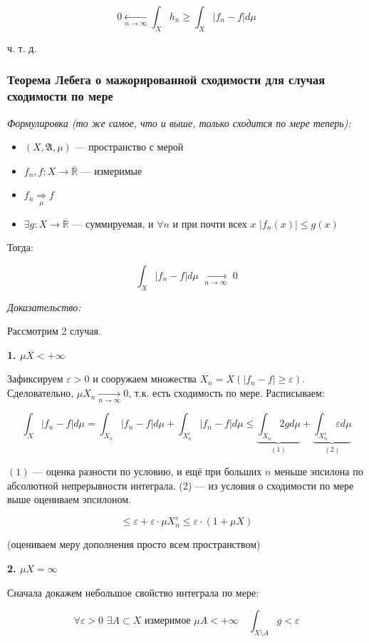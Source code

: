 \documentclass{article}
\def\dbl{\,\,}
\def\rinf{\overline{\mathbb{R}}}
\def\goesto#1{\underset{#1}{\longrightarrow}}
\def\toinf#1{\goesto{#1 \rightarrow \infty}}
\def\ntoinf{\toinf{n}}
\begin{document}
\[0 \underset{n \rightarrow \infty}{\longleftarrow} \int_{X} h_n \ge \int_{X} |f_n - f| d \mu\]

ч. т. д. 

\subsubsection{Теорема Лебега о мажорированной сходимости для случая сходимости по мере}
\textit{Формулировка (то же самое, что и выше, только сходится по мере теперь):}

\begin{itemize}
    \item $(X, \mathfrak{A}, \mu)$ --- пространство с мерой
    \item $f_n, f: X \rightarrow \rinf$ --- измеримые
    \item $f_n \underset{\mu}{\Longrightarrow} f$
    \item $\exists g: X \rightarrow \rinf$ --- суммируемая, и $\forall n$ и при почти всех $x \dbl |f_n(x)| \le g(x)$
\end{itemize}

Тогда:

\[\int_{X}|f_n - f| d \mu \dbl \ntoinf \dbl 0\]

\textit{Доказательство:}

Рассмотрим 2 случая.

\textbf{1. $\mu X < + \infty$}

Зафиксируем $\varepsilon > 0$ и сооружаем множества $X_n = X(|f_n - f| \ge \varepsilon)$. Сделовательно, $\mu X_n \ntoinf 0$, т.к. есть сходимость по мере. Расписываем:

\[\int_{X} |f_n - f| d\mu = \int_{X_n} |f_n - f| d\mu + \int_{X^c_n} |f_n - f| d\mu \le \underbrace{\int_{X_n} 2g d\mu}_{(1)} + \underbrace{\int_{X^c_n} \varepsilon d\mu}_{(2)}\]

$(1)$ --- оценка разности по условию, и ещё при больших $n$ меньше эпсилона по абсолютной непрерывности интеграла. (2) --- из условия о сходимости по мере выше оцениваем эпсилоном.

\[\le \varepsilon + \varepsilon \cdot \mu X_n^c \le \varepsilon \cdot (1 + \mu X)\]

(оцениваем меру дополнения просто всем пространством)

\textbf{2. $\mu X = \infty$}

Сначала докажем небольшое свойство интеграла по мере:

\[\forall \varepsilon > 0 \dbl \exists A \subset X \text{ измеримое } \mu A < + \infty \quad \int_{X \setminus A} g < \varepsilon\]
\end{document}
